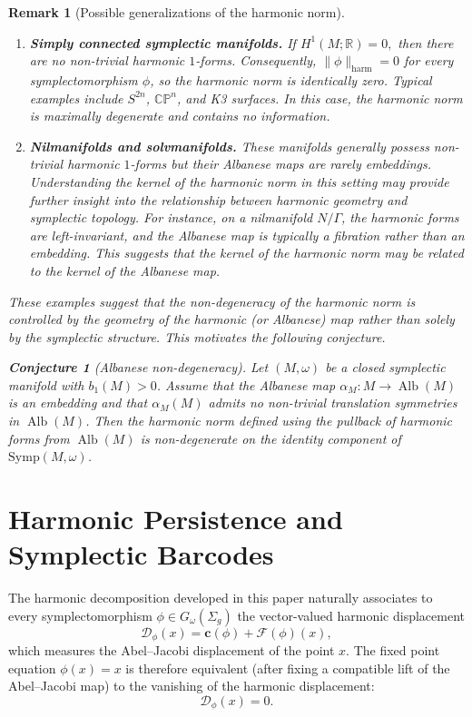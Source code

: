 \documentclass[11pt]{article}
\newtheorem{conjecture}[theorem]{Conjecture}
\newtheorem{remark}[theorem]{Remark}
\theoremstyle{definition}
\begin{document}
\begin{remark}[Possible generalizations of the harmonic norm]
\begin{enumerate}
			\item \textbf{Simply connected symplectic manifolds.}
			If $H^1(M;\mathbb R)=0,$ then there are no non-trivial harmonic $1$-forms.
			Consequently, $\|\phi\|_{\mathrm{harm}}=0$ for every symplectomorphism $\phi$,
			so the harmonic norm is identically zero. Typical examples include $S^{2n}$,
			$\mathbb{CP}^n$, and K3 surfaces. In this case, the harmonic norm is maximally
			degenerate and contains no information.
			
			\item \textbf{Nilmanifolds and solvmanifolds.}
			These manifolds generally possess non-trivial harmonic $1$-forms but their
			Albanese maps are rarely embeddings. Understanding the kernel of the harmonic
			norm in this setting may provide further insight into the relationship between
			harmonic geometry and symplectic topology. For instance, on a nilmanifold
			$N/\Gamma$, the harmonic forms are left-invariant, and the Albanese map is
			typically a fibration rather than an embedding. This suggests that the kernel of
			the harmonic norm may be related to the kernel of the Albanese map.
		\end{enumerate}
		
		These examples suggest that the non-degeneracy of the harmonic norm is
		controlled by the geometry of the harmonic (or Albanese) map rather than solely
		by the symplectic structure. This motivates the following conjecture.
		
		\begin{conjecture}[Albanese non-degeneracy]
			Let $(M,\omega)$ be a closed symplectic manifold with $b_1(M)>0$. Assume that
			the Albanese map $\alpha_M:M\rightarrow\operatorname{Alb}(M)$ is an embedding
			and that $\alpha_M(M)$ admits no non-trivial translation symmetries in
			$\operatorname{Alb}(M)$. Then the harmonic norm defined using the pullback of
			harmonic forms from $\operatorname{Alb}(M)$ is non-degenerate on the identity
			component of $\mathrm{Symp}(M,\omega)$.
		\end{conjecture}
	\end{remark}
	
	\section*{Harmonic Persistence and Symplectic Barcodes}
	
	The harmonic decomposition developed in this paper naturally associates to every
	symplectomorphism $\phi\in G_\omega(\Sigma_g)$ the vector-valued harmonic
	displacement
	\[
	\mathcal D_\phi(x) = \mathbf c(\phi)+\mathcal F(\phi)(x),
	\]
	which measures the Abel--Jacobi displacement of the point $x$. The fixed point
	equation $\phi(x)=x$ is therefore equivalent (after fixing a compatible lift of
	the Abel--Jacobi map) to the vanishing of the harmonic displacement:
	\[
	\mathcal D_\phi(x)=0.
	\]
	
\end{document}
